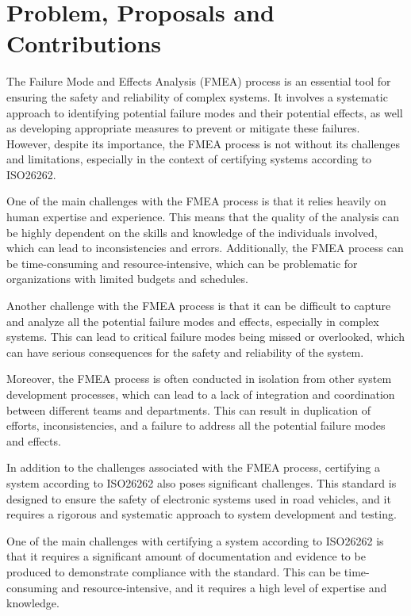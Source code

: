 \documentclass[./dissertation.tex]{subfiles}
\begin{document}
\chapter{Problem, Proposals and Contributions}
The Failure Mode and Effects Analysis (FMEA) process is an essential tool for ensuring the safety and reliability of complex systems. It involves a systematic approach to identifying potential failure modes and their potential effects, as well as developing appropriate measures to prevent or mitigate these failures. However, despite its importance, the FMEA process is not without its challenges and limitations, especially in the context of certifying systems according to ISO26262.

One of the main challenges with the FMEA process is that it relies heavily on human expertise and experience. This means that the quality of the analysis can be highly dependent on the skills and knowledge of the individuals involved, which can lead to inconsistencies and errors. Additionally, the FMEA process can be time-consuming and resource-intensive, which can be problematic for organizations with limited budgets and schedules.

Another challenge with the FMEA process is that it can be difficult to capture and analyze all the potential failure modes and effects, especially in complex systems. This can lead to critical failure modes being missed or overlooked, which can have serious consequences for the safety and reliability of the system.

Moreover, the FMEA process is often conducted in isolation from other system development processes, which can lead to a lack of integration and coordination between different teams and departments. This can result in duplication of efforts, inconsistencies, and a failure to address all the potential failure modes and effects.

In addition to the challenges associated with the FMEA process, certifying a system according to ISO26262 also poses significant challenges. This standard is designed to ensure the safety of electronic systems used in road vehicles, and it requires a rigorous and systematic approach to system development and testing.

One of the main challenges with certifying a system according to ISO26262 is that it requires a significant amount of documentation and evidence to be produced to demonstrate compliance with the standard. This can be time-consuming and resource-intensive, and it requires a high level of expertise and knowledge.
\end{document}

